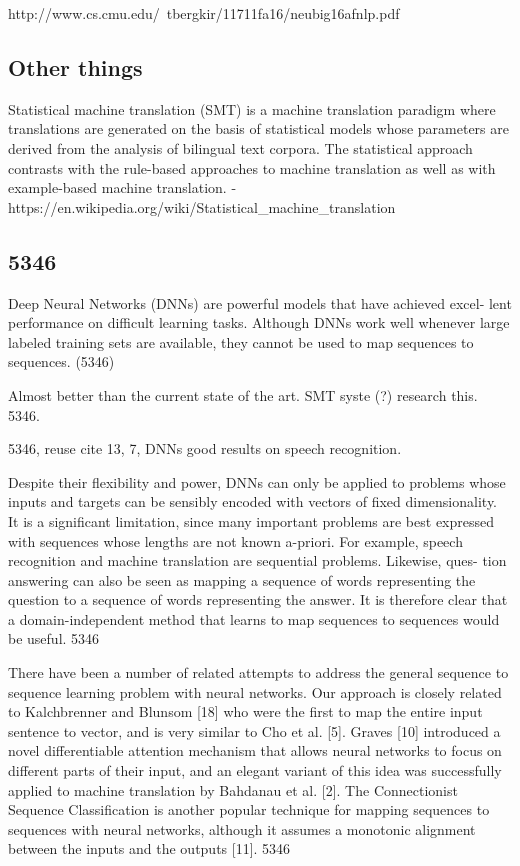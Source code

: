 http://www.cs.cmu.edu/~tbergkir/11711fa16/neubig16afnlp.pdf

\subsection{Other things}
Statistical machine translation (SMT) is a machine translation paradigm where translations are generated on the basis of statistical models whose parameters are derived from the analysis of bilingual text corpora. The statistical approach contrasts with the rule-based approaches to machine translation as well as with example-based machine translation. - https://en.wikipedia.org/wiki/Statistical\_machine\_translation



\subsection{5346}
Deep Neural Networks (DNNs) are powerful models that have achieved excel- lent performance on difficult learning tasks. Although DNNs work well whenever large labeled training sets are available, they cannot be used to map sequences to sequences. (5346)

Almost better than the current state of the art. SMT syste (?) research this. 5346.

5346, reuse cite 13, 7, DNNs good results on speech recognition.

Despite their flexibility and power, DNNs can only be applied to problems whose inputs and targets can be sensibly encoded with vectors of fixed dimensionality. It is a significant limitation, since many important problems are best expressed with sequences whose lengths are not known a-priori. For example, speech recognition and machine translation are sequential problems. Likewise, ques- tion answering can also be seen as mapping a sequence of words representing the question to a sequence of words representing the answer. It is therefore clear that a domain-independent method that learns to map sequences to sequences would be useful. 5346

There have been a number of related attempts to address the general sequence to sequence learning problem with neural networks. Our approach is closely related to Kalchbrenner and Blunsom [18] who were the first to map the entire input sentence to vector, and is very similar to Cho et al. [5]. Graves [10] introduced a novel differentiable attention mechanism that allows neural networks to focus on different parts of their input, and an elegant variant of this idea was successfully applied to machine translation by Bahdanau et al. [2]. The Connectionist Sequence Classification is another popular technique for mapping sequences to sequences with neural networks, although it assumes a monotonic alignment between the inputs and the outputs [11]. 5346

